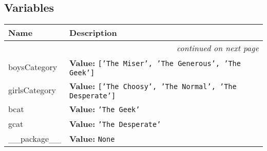 
  \subsection{Variables}

    \vspace{-1cm}
\hspace{\varindent}\begin{longtable}{|p{\varnamewidth}|p{\vardescrwidth}|l}
\cline{1-2}
\cline{1-2} \centering \textbf{Name} & \centering \textbf{Description}& \\
\cline{1-2}
\endhead\cline{1-2}\multicolumn{3}{r}{\small\textit{continued on next page}}\\\endfoot\cline{1-2}
\endlastfoot\raggedright b\-o\-y\-s\-C\-a\-t\-e\-g\-o\-r\-y\- & \raggedright \textbf{Value:} 
{\tt \texttt{[}\texttt{'}\texttt{The Miser}\texttt{'}\texttt{, }\texttt{'}\texttt{The Generous}\texttt{'}\texttt{, }\texttt{'}\texttt{The Geek}\texttt{'}\texttt{]}}&\\
\cline{1-2}
\raggedright g\-i\-r\-l\-s\-C\-a\-t\-e\-g\-o\-r\-y\- & \raggedright \textbf{Value:} 
{\tt \texttt{[}\texttt{'}\texttt{The Choosy}\texttt{'}\texttt{, }\texttt{'}\texttt{The Normal}\texttt{'}\texttt{, }\texttt{'}\texttt{The Desperate}\texttt{'}\texttt{]}}&\\
\cline{1-2}
\raggedright b\-c\-a\-t\- & \raggedright \textbf{Value:} 
{\tt \texttt{'}\texttt{The Geek}\texttt{'}}&\\
\cline{1-2}
\raggedright g\-c\-a\-t\- & \raggedright \textbf{Value:} 
{\tt \texttt{'}\texttt{The Desperate}\texttt{'}}&\\
\cline{1-2}
\raggedright \_\-\_\-p\-a\-c\-k\-a\-g\-e\-\_\-\_\- & \raggedright \textbf{Value:} 
{\tt None}&\\
\cline{1-2}
\end{longtable}


